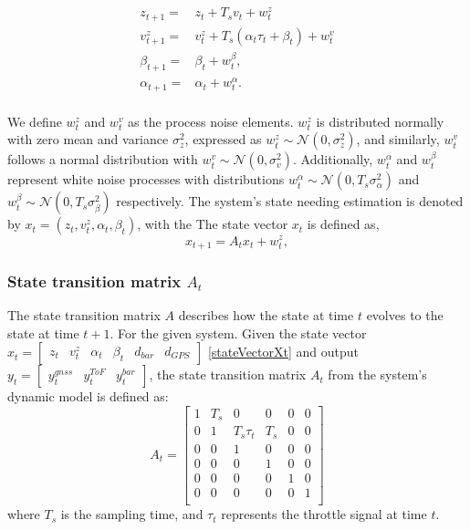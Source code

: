 \documentclass{article}
\begin{document}
    \begin{align}
        z_{t+1} =& z_t + {T_s}{v_t} + w^{z}_{t}\\
        v_{t+1}^z =& v_t^z + T_s (\alpha_t \tau_t + \beta_t) + w_t^v\\
        \beta_{t+1} {}={} & \beta_t + w^\beta_t,\\
        \alpha_{t+1} {}={} & \alpha_t + w^\alpha_t.\\
    \end{align}

    We define $w_t^z$ and $w_t^v$ as the process noise elements.
    $w_t^z$ is distributed normally with zero mean and variance
    $\sigma_z^2$, expressed as $w_t^z \sim \mathcal{N}(0, \sigma_z^2)$, 
    and similarly, $w_t^v$ follows a normal distribution with $w_t^v \sim \mathcal{N}(0, \sigma_v^2)$.
    Additionally, $w_t^\alpha$ and $w_t^\beta$ represent white noise processes with distributions
    $w_t^\alpha \sim \mathcal{N}(0, T_s \sigma_\alpha^2)$ and $w_t^\beta \sim \mathcal{N}(0, T_s \sigma_\beta^2)$ 
    respectively. The system's state needing estimation is denoted by $x_t = (z_t, v_t^z, \alpha_t, \beta_t)$, 
    with the The state vector \( x_t \) is defined as,
    \begin{equation}
        x_{t+1} = A_t x_t + w_t^z,
    \end{equation}

    \subsubsection*{State transition matrix \( A_t \)}
    The state transition matrix \( A \) describes how the state at time \( t \) evolves to the state at time \( t+1 \). For the given system.
    Given the state vector \( x_t = \begin{bmatrix} z_t&  v_t^z&  \alpha_t&  \beta_t& d_{bar}& d_{GPS} \end{bmatrix} \) \eqref{stateVectorXt} and output \(y_t = \begin{bmatrix} y^{gnss}_t & y^{ToF}_t& y^{bar}_t \end{bmatrix} \), the state transition matrix \( A_t \) from the system's dynamic model is defined as:
    \begin{equation}
    A_t = 
    \begin{bmatrix}
    1 & T_s & 0 & 0 & 0 & 0\\
    0 & 1 & T_s \tau_t & T_s & 0 & 0\\
    0 & 0 & 1 & 0 & 0 & 0 \\
    0 & 0 & 0 & 1 & 0 & 0 \\
    0 & 0 & 0 & 0 & 1 & 0 \\
    0 & 0 & 0 & 0 & 0 & 1 \\
    \end{bmatrix}
    \end{equation}
    where \( T_s \) is the sampling time, and \( \tau_t \) represents the throttle signal at time \( t \).
  
\end{document}
